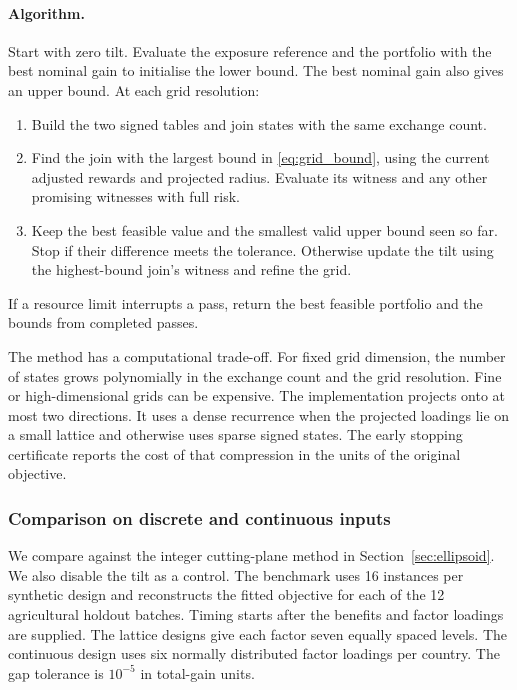 \paragraph{Algorithm.}
Start with zero tilt. Evaluate the exposure reference and the portfolio with
the best nominal gain to initialise the lower bound. The best nominal gain
also gives an upper bound. At each grid resolution:
\begin{enumerate}
 \item Build the two signed tables and join states with the same exchange count.
 \item Find the join with the largest bound in \eqref{eq:grid_bound}, using the
       current adjusted rewards and projected radius. Evaluate its witness
       and any other promising witnesses with full risk.
 \item Keep the best feasible value and the smallest valid upper bound seen
       so far. Stop if their difference meets the tolerance. Otherwise update
       the tilt using the highest-bound join's witness and refine the grid.
\end{enumerate}
If a resource limit interrupts a pass, return the best feasible portfolio
and the bounds from completed passes.

The method has a computational trade-off. For fixed grid dimension, the number
of states grows polynomially in the exchange count and the grid resolution.
Fine or high-dimensional grids can be expensive. The implementation projects
onto at most two directions. It uses a dense recurrence when the projected
loadings lie on a small lattice and otherwise uses sparse signed states.
The early stopping certificate reports the cost of that compression in the
units of the original objective.

\subsubsection{Comparison on discrete and continuous inputs}

We compare against the integer cutting-plane method in
Section~\ref{sec:ellipsoid}. We also disable the tilt as a control. The benchmark
uses 16 instances per synthetic design and reconstructs the fitted objective
for each of the 12 agricultural holdout batches. Timing starts after the
benefits and factor loadings are supplied. The lattice designs give each
factor seven equally spaced levels. The continuous design uses six normally
distributed factor loadings per country. The gap tolerance is $10^{-5}$ in
total-gain units.
